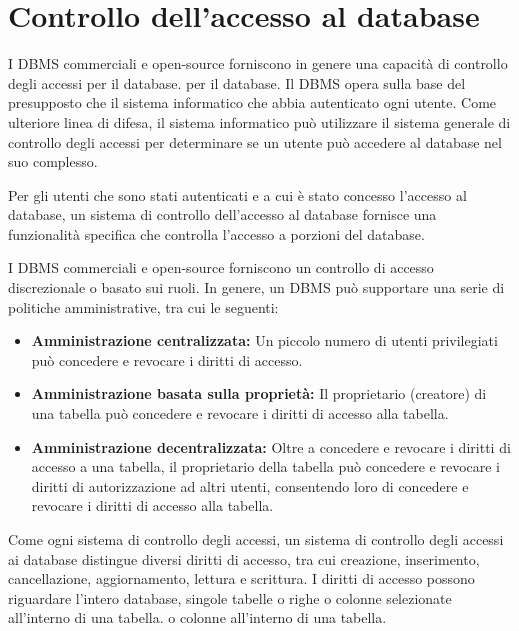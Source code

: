 \section{Controllo dell'accesso al database}
I DBMS commerciali e open-source forniscono in genere una capacità di controllo degli accessi per il database.
per il database. Il DBMS opera sulla base del presupposto che il sistema informatico che abbia autenticato ogni utente. Come ulteriore linea di difesa, il sistema informatico può utilizzare il sistema generale di controllo degli accessi per determinare se un utente può accedere al database nel suo complesso.

\singlespacing

Per gli utenti che sono stati autenticati e a cui è stato concesso l'accesso al database, un sistema di controllo dell'accesso al database fornisce una funzionalità specifica che controlla l'accesso a porzioni del database.

\singlespacing

I DBMS commerciali e open-source forniscono un controllo di accesso discrezionale o basato sui ruoli. In genere, un DBMS può supportare una serie di politiche amministrative, tra cui le seguenti:

\begin{itemize}
    \item \textbf{Amministrazione centralizzata:} Un piccolo numero di utenti privilegiati può concedere e revocare i diritti di accesso.

    \item \textbf{Amministrazione basata sulla proprietà:} Il proprietario (creatore) di una tabella può concedere e revocare i diritti di accesso alla tabella.
    
    \item \textbf{Amministrazione decentralizzata:} Oltre a concedere e revocare i diritti di accesso a una tabella, il proprietario della tabella può concedere e revocare i diritti di autorizzazione ad altri utenti, consentendo loro di concedere e revocare i diritti di accesso alla tabella.
\end{itemize}
Come ogni sistema di controllo degli accessi, un sistema di controllo degli accessi ai database distingue diversi diritti di accesso, tra cui creazione, inserimento, cancellazione, aggiornamento, lettura e scrittura. I diritti di accesso possono riguardare l'intero database, singole tabelle o righe o colonne selezionate all'interno di una tabella.
o colonne all'interno di una tabella. 

